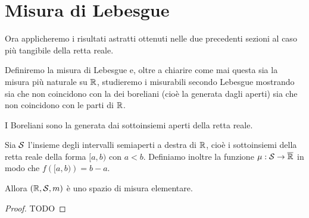 \section{Misura di Lebesgue}
Ora applicheremo i risultati astratti ottenuti nelle due precedenti sezioni al caso più tangibile della retta reale.

Definiremo la misura di Lebesgue e, oltre a chiarire come mai questa sia la misura più naturale su $\R$, studieremo i misurabili secondo Lebesgue mostrando sia che non coincidono con la \sigalg{} dei boreliani (cioè la \sigalg{} generata dagli aperti) sia che non coincidono con le parti di $\R$.

\begin{definition}
	I Boreliani sono la \sigalg{} generata dai sottoinsiemi aperti della retta reale.
\end{definition}

\begin{theorem}
	Sia $\S$ l'insieme degli intervalli semiaperti a destra di $\R$, cioè i sottoinsiemi della retta reale della forma $[a,b)$ con $a<b$. 
	Definiamo inoltre la funzione $\mu:\S\to\Rbar$ in modo che $f\left([a,b)\right)=b-a$.
	
	Allora $(\R,\S,m)$ è uno spazio di misura elementare.
\end{theorem}
\begin{proof}
	TODO
\end{proof}